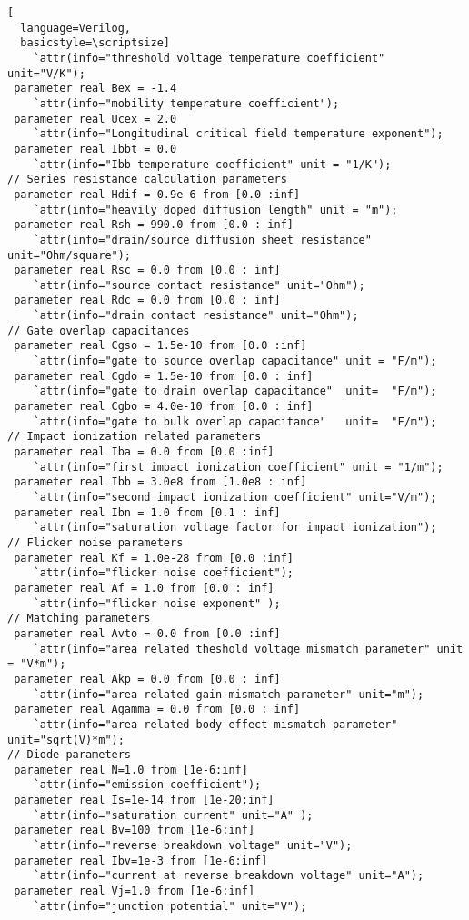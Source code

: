 \begin{lstlisting}[
  language=Verilog,
  basicstyle=\scriptsize]
	`attr(info="threshold voltage temperature coefficient" unit="V/K");
 parameter real Bex = -1.4     
	`attr(info="mobility temperature coefficient");
 parameter real Ucex = 2.0     
	`attr(info="Longitudinal critical field temperature exponent");
 parameter real Ibbt = 0.0     
	`attr(info="Ibb temperature coefficient" unit = "1/K");
// Series resistance calculation parameters
 parameter real Hdif = 0.9e-6 from [0.0 :inf]  
	`attr(info="heavily doped diffusion length" unit = "m");
 parameter real Rsh = 990.0 from [0.0 : inf]   
	`attr(info="drain/source diffusion sheet resistance" unit="Ohm/square");
 parameter real Rsc = 0.0 from [0.0 : inf]     
	`attr(info="source contact resistance" unit="Ohm");
 parameter real Rdc = 0.0 from [0.0 : inf]     
	`attr(info="drain contact resistance" unit="Ohm");
// Gate overlap capacitances
 parameter real Cgso = 1.5e-10 from [0.0 :inf]  
	`attr(info="gate to source overlap capacitance" unit = "F/m");
 parameter real Cgdo = 1.5e-10 from [0.0 : inf] 
	`attr(info="gate to drain overlap capacitance"  unit=  "F/m");
 parameter real Cgbo = 4.0e-10 from [0.0 : inf] 
	`attr(info="gate to bulk overlap capacitance"   unit=  "F/m");
// Impact ionization related parameters
 parameter real Iba = 0.0 from [0.0 :inf]        
	`attr(info="first impact ionization coefficient" unit = "1/m");
 parameter real Ibb = 3.0e8 from [1.0e8 : inf]   
	`attr(info="second impact ionization coefficient" unit="V/m");
 parameter real Ibn = 1.0 from [0.1 : inf]       
	`attr(info="saturation voltage factor for impact ionization");
// Flicker noise parameters
 parameter real Kf = 1.0e-28 from [0.0 :inf]  
	`attr(info="flicker noise coefficient");
 parameter real Af = 1.0 from [0.0 : inf]     
	`attr(info="flicker noise exponent" );
// Matching parameters
 parameter real Avto = 0.0 from [0.0 :inf]     
	`attr(info="area related theshold voltage mismatch parameter" unit = "V*m");
 parameter real Akp = 0.0 from [0.0 : inf]     
	`attr(info="area related gain mismatch parameter" unit="m");
 parameter real Agamma = 0.0 from [0.0 : inf]  
	`attr(info="area related body effect mismatch parameter" unit="sqrt(V)*m");
// Diode parameters
 parameter real N=1.0 from [1e-6:inf] 
	`attr(info="emission coefficient");
 parameter real Is=1e-14 from [1e-20:inf] 
	`attr(info="saturation current" unit="A" );
 parameter real Bv=100 from [1e-6:inf] 
	`attr(info="reverse breakdown voltage" unit="V");
 parameter real Ibv=1e-3 from [1e-6:inf] 
	`attr(info="current at reverse breakdown voltage" unit="A");
 parameter real Vj=1.0 from [1e-6:inf] 
	`attr(info="junction potential" unit="V");

\end{lstlisting}
